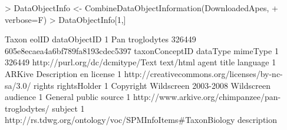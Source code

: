 \documentclass[12pt]{article}
\begin{document}
\begin{Schunk}
\begin{Sinput}
> DataObjectInfo <- CombineDataObjectInformation(DownloadedApes, 
+ 	verbose=F)
> DataObjectInfo[1,]
\end{Sinput}
\begin{Soutput}
            Taxon  eolID                     dataObjectID
1 Pan troglodytes 326449 605e8ecaea4a6bf789fa8193cdec5397
  taxonConceptID                         dataType  mimeType
1         326449 http://purl.org/dc/dcmitype/Text text/html
   agent       title language
1 ARKive Description       en
                                            license
1 http://creativecommons.org/licenses/by-nc-sa/3.0/
                          rights rightsHolder
1 Copyright Wildscreen 2003-2008   Wildscreen
        audience
1 General public
                                             source
1 http://www.arkive.org/chimpanzee/pan-troglodytes/
                                                    subject
1 http://rs.tdwg.org/ontology/voc/SPMInfoItems#TaxonBiology
                                                                                                                                                                                                                                                                                                                                                                                                                                                                                                                                                                                                                                                                                                                                                                                                                                                                                                                                                                                                                                                                                                                                                                                                    description

\end{Soutput}
\end{Schunk}
\end{document}
